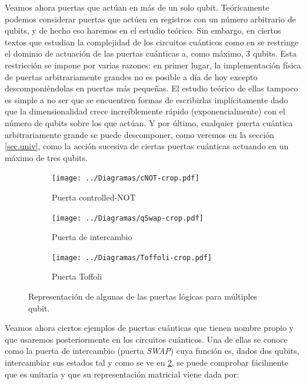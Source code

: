 \documentclass[11pt, spanish]{report}
\numberwithin{equation}{section}
\numberwithin{defin}{section}
\begin{document}
Veamos ahora puertas que actúan en más de un solo qubit. Teóricamente podemos considerar puertas que actúen en registros con un número arbitrario de qubits, y de hecho eso haremos en el estudio teórico. Sin embargo, en ciertos textos que estudian la complejidad de los circuitos cuánticos como en \cite{arora2009computational} se restringe el dominio de actuación de las puertas cuánticas a, como máximo, 3 qubits. Esta restricción se impone por varias razones: en primer lugar, la implementación física de puertas arbitrariamente grandes no es posible a día de hoy excepto descomponiéndolas en puertas más pequeñas. El estudio teórico de ellas tampoco es simple a no ser que se encuentren formas de escribirlas implícitamente dado que la dimensionalidad crece increíblemente rápido (exponencialmente) con el número de qubits sobre los que actúan. Y por último, cualquier puerta cuántica arbitrariamente grande se puede descomponer, como veremos en la sección \ref{sec.univ}, como la acción sucesiva de ciertas puertas cuánticas actuando en un máximo de tres qubits. \\

\begin{figure}
\begin{subfigure}{.33\textwidth}
  \centering
  \texttt{[image: ../Diagramas/cNOT-crop.pdf]}
  \caption{Puerta controlled-NOT}
  \label{fig2:sfig1}
\end{subfigure}%
\begin{subfigure}{.33\textwidth}
  \centering
  \texttt{[image: ../Diagramas/qSwap-crop.pdf]}
  \caption{Puerta de intercambio}
  \label{fig2:sfig2}
\end{subfigure}%
\begin{subfigure}{.33\textwidth}
  \centering
  \texttt{[image: ../Diagramas/Toffoli-crop.pdf]}
  \caption{Puerta Toffoli}
  \label{fig2:sfig3}
\end{subfigure}
\caption{Representación de algunas de las puertas lógicas para múltiples qubit.}
\label{fig2:figCircuitos}
\end{figure}

Veamos ahora ciertos ejemplos de puertas cuánticas que tienen nombre propio y que usaremos posteriormente en los circuitos cuánticos. Una de ellas se conoce como la puerta de intercambio (puerta \emph{SWAP}) cuya función es, dados dos qubits, intercambiar sus estados tal y como se ve en \ref{fig2:sfig2}, se puede comprobar fácilmente que es unitaria y que su representación matricial viene dada por:
\end{document}
